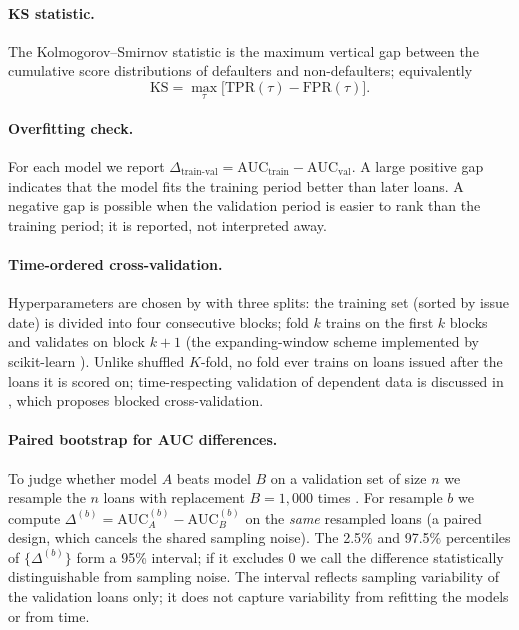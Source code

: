 \paragraph{KS statistic.} The Kolmogorov--Smirnov statistic \cite{massey1951} is the maximum vertical gap between the cumulative score distributions of defaulters and non-defaulters; equivalently
\begin{equation}
\mathrm{KS}=\max_{\tau}\big[\mathrm{TPR}(\tau)-\mathrm{FPR}(\tau)\big].
\end{equation}

\paragraph{Overfitting check.} For each model we report $\Delta_{\text{train-val}}=\mathrm{AUC}_{\text{train}}-\mathrm{AUC}_{\text{val}}$. A large positive gap indicates that the model fits the training period better than later loans. A negative gap is possible when the validation period is easier to rank than the training period; it is reported, not interpreted away.

\paragraph{Time-ordered cross-validation.} Hyperparameters are chosen by  with three splits: the training set (sorted by issue date) is divided into four consecutive blocks; fold $k$ trains on the first $k$ blocks and validates on block $k{+}1$ (the expanding-window scheme implemented by scikit-learn \cite{pedregosa2011}). Unlike shuffled $K$-fold, no fold ever trains on loans issued after the loans it is scored on; time-respecting validation of dependent data is discussed in \cite{bergmeir2012}, which proposes blocked cross-validation.

\paragraph{Paired bootstrap for AUC differences.} To judge whether model $A$ beats model $B$ on a validation set of size $n$ we resample the $n$ loans with replacement $B=1{,}000$ times \cite{efron1979}. For resample $b$ we compute $\Delta^{(b)}=\mathrm{AUC}_A^{(b)}-\mathrm{AUC}_B^{(b)}$ on the \emph{same} resampled loans (a paired design, which cancels the shared sampling noise). The 2.5\% and 97.5\% percentiles of $\{\Delta^{(b)}\}$ form a 95\% interval; if it excludes $0$ we call the difference statistically distinguishable from sampling noise. The interval reflects sampling variability of the validation loans only; it does not capture variability from refitting the models or from time.

